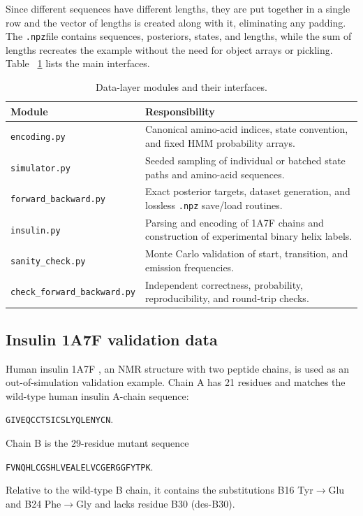 \documentclass[12pt]{article}
\begin{document}
Since different sequences have different lengths, they are put together in a single row and the vector of lengths is created along with it, eliminating any padding. The \texttt{.npz}file contains sequences, posteriors, states, and lengths, while the sum of lengths recreates the example without the need for object arrays or pickling. Table ~\ref{tab:data-interfaces} lists the main interfaces.

\begin{table}[ht]
    \centering
    \caption{Data-layer modules and their interfaces.}
    \label{tab:data-interfaces}
    \footnotesize
    \begin{tabular}{p{}|>{\raggedright\arraybackslash}p{}}
        \hline
        Module & Responsibility \\
        \hline
        \texttt{encoding.py} & Canonical amino-acid indices, state convention, and fixed HMM probability arrays. \\
        \texttt{simulator.py} & Seeded sampling of individual or batched state paths and amino-acid sequences. \\
        \texttt{forward\_backward.py} & Exact posterior targets, dataset generation, and lossless \texttt{.npz} save/load routines. \\
        \texttt{insulin.py} & Parsing and encoding of 1A7F chains and construction of experimental binary helix labels. \\
        \texttt{sanity\_check.py} & Monte Carlo validation of start, transition, and emission frequencies. \\
        {\raggedright\texttt{check\_forward\_\allowbreak backward.py}\par} & Independent correctness, probability, reproducibility, and round-trip checks. \\
        \hline
    \end{tabular}
\end{table}

\subsection{Insulin 1A7F validation data}

Human insulin 1A7F \parencite{insulin}, an NMR structure with two peptide chains,
is used as an out-of-simulation validation example. Chain A
has 21 residues and matches the wild-type human insulin A-chain sequence:
\begin{center}
\small\texttt{GIVEQCCTSICSLYQLENYCN}.
\end{center}
Chain B is the 29-residue mutant sequence
\begin{center}
\small\texttt{FVNQHLCGSHLVEALELVCGERGGFYTPK}.
\end{center}
Relative to the wild-type B chain, it contains the substitutions B16
Tyr$\rightarrow$Glu and B24 Phe$\rightarrow$Gly and lacks residue B30 (des-B30).
\end{document}
